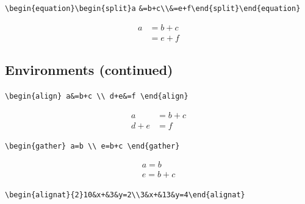\documentclass[9pt]{extarticle}
\begin{document}

{\small\verb|\begin{equation}\begin{split}a| \verb|&=b+c\\&=e+f\end{split}\end{equation}|}

\begin{equation}\begin{split}a &=b+c\\&=e+f\end{split}\end{equation}

\newpage
\subsection*{Environments (continued)}

{\small\verb|\begin{align} a&=b+c \\ d+e&=f \end{align}|}

\begin{align} a&=b+c \\ d+e&=f \end{align}

{\small\verb|\begin{gather} a=b \\ e=b+c \end{gather}|}

\begin{gather} a=b \\ e=b+c \end{gather}

{\small\verb|\begin{alignat}{2}10&x+&3&y=2\\3&x+&13&y=4\end{alignat}|}
\end{document}

